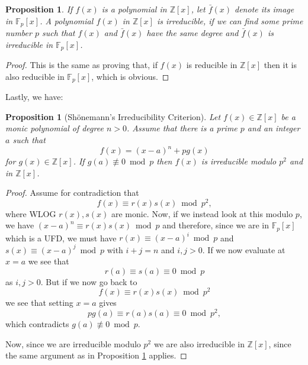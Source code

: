 \documentclass[11pt,a4paper]{report}
\theoremstyle{plain}
\newtheorem{prop}[subsection]{Proposition}
\theoremstyle{definition}
\theoremstyle{definition}
\newcommand{\ZZ}{\mathbb{Z}}
\def\FF{\mathbb{F}}
\begin{document}
	\begin{prop}\label{prop: irred pol mod p}
		If $f(x)$ is a polynomial in $\ZZ[x]$, let $\bar{f}(x)$ denote its image in $\FF_p[x]$. A polynomial $f(x)$ in $\ZZ[x]$ is irreducible, if we can find some prime number $p$ such that $f(x)$ and $\bar{f}(x)$ have the same degree and $\bar{f}(x)$ is irreducible in $\FF_p[x]$.
	\end{prop}
	\begin{proof}
		This is the same as proving that, if $f(x)$ is reducible in $\ZZ[x]$ then it is also reducible in $\FF_p[x]$, which is obvious.
	\end{proof}
	
	Lastly, we have: 
	
	
	
	\begin{prop}[Sh\"onemann's Irreducibility Criterion]\label{prop: shonemann}
		Let $f(x) \in \ZZ[x]$ be a monic polynomial of degree $n>0$. Assume that there is a prime $p$ and an integer $a$ such that \[f(x)=(x-a)^n+pg(x)\] for $g(x) \in \ZZ[x]$. If $g(a) \not \equiv 0 \bmod p$ then $f(x)$ is irreducible modulo $p^2$ and in $\ZZ[x]$.
	\end{prop}
	
	\begin{proof}
		Assume for contradiction that \[f(x) \equiv r(x)s(x) \bmod p^2,\] where WLOG $r(x),s(x)$ are monic. Now, if we instead look at this modulo $p$, we have $(x-a)^n \equiv r(x)s(x) \bmod p$ and therefore, since we are in $\FF_p[x]$ which is a UFD, we must have $r(x) \equiv (x-a)^i \bmod p$ and $s(x) \equiv (x-a)^j \bmod p$ with $i+j=n$ and $i,j>0$. If we now evaluate at $x=a$ we see that $$r(a) \equiv s(a) \equiv 0 \bmod p$$ as $i,j >0$. But if we now go back to $$f(x) \equiv r(x)s(x) \bmod p^2$$ we see that setting $x=a$ gives $$pg(a) \equiv r(a)s(a) \equiv 0 \bmod p^2,$$ which contradicts $g(a) \not \equiv 0 \bmod p$.
		
		
		Now, since we are irreducible modulo $p^2$ we are also irreducible in $\ZZ[x]$, since the same argument as in Proposition \ref{prop: irred pol mod p} applies. 
	\end{proof}
	
	
	
	
\end{document}
